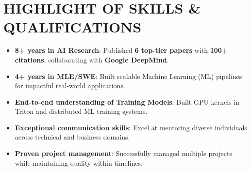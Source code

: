 \section{HIGHLIGHT OF SKILLS \& QUALIFICATIONS}
\begin{itemize}
    \item \textbf{8+ years in AI Research}: Published \textbf{6 top-tier papers} with \textbf{100+ citations}, collaborating with \textbf{Google DeepMind}.
    \item \textbf{4+ years in MLE/SWE}: Built scalable Machine Learning (ML) pipelines for impactful real-world applications.
    \item \textbf{End-to-end understanding of Training Models}: Built GPU kernels in Triton and distributed ML training systems.
    \item \textbf{Exceptional communication skills}: Excel at mentoring diverse individuals across technical and business domains.
    \item \textbf{Proven project management}: Successfully managed multiple projects while maintaining quality within timelines.
\end{itemize}